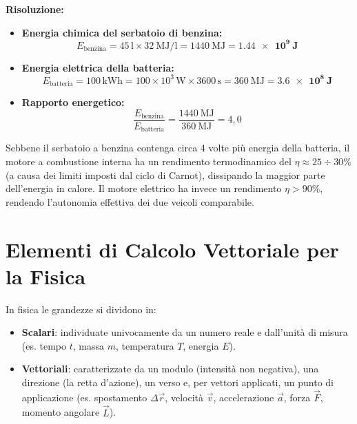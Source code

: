 \textbf{Risoluzione:}
\begin{itemize}
    \item \textbf{Energia chimica del serbatoio di benzina:}
    \begin{equation}
        E_{\text{benzina}} = 45\,\si{\litre} \times \SI{32}{\mega\joule\per\litre} = \SI{1440}{\mega\joule} = \mathbf{\SI{1.44e9}{\joule}}
    \end{equation}
    \item \textbf{Energia elettrica della batteria:}
    \begin{equation}
        E_{\text{batteria}} = 100\,\si{\kilo\watt\hour} = 100 \times 10^3\,\si{\watt} \times 3600\,\si{\second} = \SI{360}{\mega\joule} = \mathbf{\SI{3.6e8}{\joule}}
    \end{equation}
    \item \textbf{Rapporto energetico:}
    \begin{equation}
        \frac{E_{\text{benzina}}}{E_{\text{batteria}}} = \frac{\SI{1440}{\mega\joule}}{\SI{360}{\mega\joule}} = 4{,}0
    \end{equation}
\end{itemize}
\begin{osservazione}
Sebbene il serbatoio a benzina contenga circa 4 volte più energia della batteria, il motore a combustione interna ha un rendimento termodinamico del $\eta \approx 25\div 30\%$ (a causa dei limiti imposti dal ciclo di Carnot), dissipando la maggior parte dell'energia in calore. Il motore elettrico ha invece un rendimento $\eta > 90\%$, rendendo l'autonomia effettiva dei due veicoli comparabile.
\end{osservazione}

\section{Elementi di Calcolo Vettoriale per la Fisica}
\label{sec:calcolo_vettoriale_completo}

In fisica le grandezze si dividono in:
\begin{itemize}
    \item \textbf{Scalari}: individuate univocamente da un numero reale e dall'unità di misura (es. tempo $t$, massa $m$, temperatura $T$, energia $E$).
    \item \textbf{Vettoriali}: caratterizzate da un modulo (intensità non negativa), una direzione (la retta d'azione), un verso e, per vettori applicati, un punto di applicazione (es. spostamento $\Delta\vec{r}$, velocità $\vec{v}$, accelerazione $\vec{a}$, forza $\vec{F}$, momento angolare $\vec{L}$).
\end{itemize}

